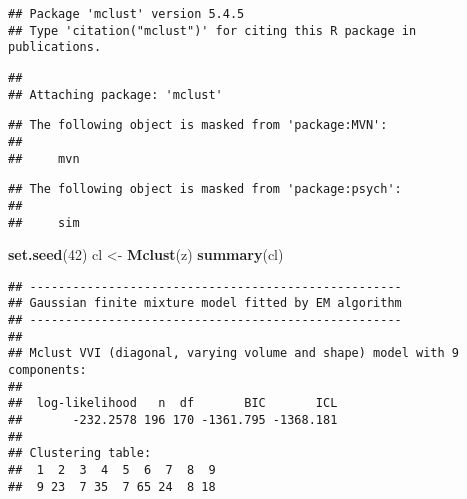 \documentclass[
]{article}
\newenvironment{Shaded}{\begin{snugshade}}{\end{snugshade}}
\newcommand{\DataTypeTok}[1]{\textcolor[rgb]{0.13,0.29,0.53}{#1}}
\newcommand{\DecValTok}[1]{\textcolor[rgb]{0.00,0.00,0.81}{#1}}
\newcommand{\KeywordTok}[1]{\textcolor[rgb]{0.13,0.29,0.53}{\textbf{#1}}}
\newcommand{\NormalTok}[1]{#1}
\newcommand{\OperatorTok}[1]{\textcolor[rgb]{0.81,0.36,0.00}{\textbf{#1}}}
\newcommand{\StringTok}[1]{\textcolor[rgb]{0.31,0.60,0.02}{#1}}
\begin{document}
\begin{verbatim}
## Package 'mclust' version 5.4.5
## Type 'citation("mclust")' for citing this R package in publications.
\end{verbatim}

\begin{verbatim}
## 
## Attaching package: 'mclust'
\end{verbatim}

\begin{verbatim}
## The following object is masked from 'package:MVN':
## 
##     mvn
\end{verbatim}

\begin{verbatim}
## The following object is masked from 'package:psych':
## 
##     sim
\end{verbatim}

\begin{Shaded}
\begin{Highlighting}[]
\KeywordTok{set.seed}\NormalTok{(}\DecValTok{42}\NormalTok{)}
\NormalTok{cl <-}\StringTok{ }\KeywordTok{Mclust}\NormalTok{(z)}
\KeywordTok{summary}\NormalTok{(cl)}
\end{Highlighting}
\end{Shaded}

\begin{verbatim}
## ---------------------------------------------------- 
## Gaussian finite mixture model fitted by EM algorithm 
## ---------------------------------------------------- 
## 
## Mclust VVI (diagonal, varying volume and shape) model with 9 components: 
## 
##  log-likelihood   n  df       BIC       ICL
##       -232.2578 196 170 -1361.795 -1368.181
## 
## Clustering table:
##  1  2  3  4  5  6  7  8  9 
##  9 23  7 35  7 65 24  8 18
\end{verbatim}

\begin{Shaded}
\end{Shaded}
\end{document}
